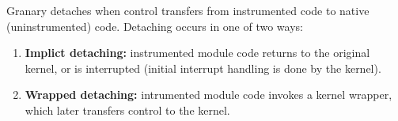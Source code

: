\documentclass[preprint]{sigplanconf}
\begin{document}
Granary detaches when control transfers from instrumented code to native (uninstrumented) code. Detaching occurs in one of two ways: \begin{enumerate}
	\item {\bf Implict detaching:} instrumented module code returns to the original kernel, or is interrupted (initial interrupt handling is done by the kernel).
	\item {\bf Wrapped detaching:} intrumented module code invokes a kernel wrapper, which later transfers control to the kernel.
\end{enumerate}





\end{document}
